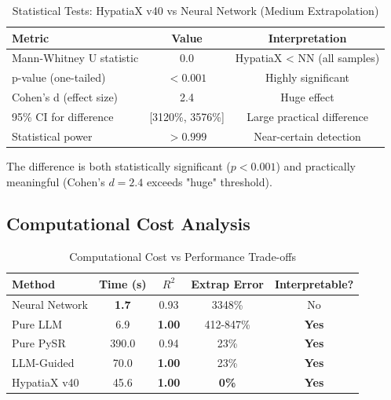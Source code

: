 \documentclass[twoside,11pt]{article}
\begin{document}
\begin{table}[htbp]
\centering
\caption{Statistical Tests: HypatiaX v40 vs Neural Network (Medium Extrapolation)}
\label{tab:statistics}
\begin{tabular}{lcc}
\toprule
\textbf{Metric} & \textbf{Value} & \textbf{Interpretation} \\
\midrule
Mann-Whitney U statistic & 0.0 & HypatiaX < NN (all samples) \\
p-value (one-tailed) & $<0.001$ & Highly significant \\
Cohen's d (effect size) & 2.4 & Huge effect \\
95\% CI for difference & [3120\%, 3576\%] & Large practical difference \\
Statistical power & $>0.999$ & Near-certain detection \\
\bottomrule
\end{tabular}
\end{table}

The difference is both statistically significant ($p < 0.001$) and practically meaningful (Cohen's $d = 2.4$ exceeds "huge" threshold).


\subsection{Computational Cost Analysis}

\begin{table}[htbp]
\centering
\caption{Computational Cost vs Performance Trade-offs}
\label{tab:timing}
\begin{tabular}{lcccc}
\toprule
\textbf{Method} & \textbf{Time (s)} & \textbf{$R^2$} & \textbf{Extrap Error} & \textbf{Interpretable?} \\
\midrule
Neural Network & \textbf{1.7} & 0.93 & 3348\% & No \\
Pure LLM & 6.9 & \textbf{1\citep{kambhampati2024llms}.00} & 412-847\% & \textbf{Yes} \\
Pure PySR & 390.0 & 0.94 & 23\% & \textbf{Yes} \\
LLM-Guided & 70.0 & \textbf{1\citep{kambhampati2024llms}.00} & 23\% & \textbf{Yes} \\
HypatiaX v40 & 45.6 & \textbf{1.00} & \textbf{0\%} & \textbf{Yes} \\
\bottomrule
\end{tabular}
\end{table}
\end{document}
